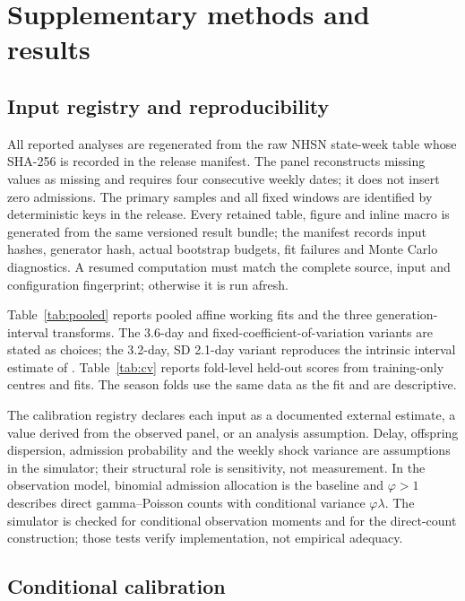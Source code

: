 \section{Supplementary methods and results}
\label{app:supplement}

\subsection{Input registry and reproducibility}
\label{app:inputs}

All reported analyses are regenerated from the raw NHSN state-week table whose SHA-256 is recorded in the release manifest. The panel reconstructs missing values as missing and requires four consecutive weekly dates; it does not insert zero admissions. The primary samples and all fixed windows are identified by deterministic keys in the release. Every retained table, figure and inline macro is generated from the same versioned result bundle; the manifest records input hashes, generator hash, actual bootstrap budgets, fit failures and Monte Carlo diagnostics. A resumed computation must match the complete source, input and configuration fingerprint; otherwise it is run afresh.

Table~\ref{tab:pooled} reports pooled affine working fits and the three generation-interval transforms. The 3.6-day and fixed-coefficient-of-variation variants are stated as choices; the 3.2-day, SD 2.1-day variant reproduces the intrinsic interval estimate of \citet{chan2025estimating}. Table~\ref{tab:cv} reports fold-level held-out scores from training-only centres and fits. The season folds use the same data as the fit and are descriptive.

The calibration registry declares each input as a documented external estimate, a value derived from the observed panel, or an analysis assumption. Delay, offspring dispersion, admission probability and the weekly shock variance are assumptions in the simulator; their structural role is sensitivity, not measurement. In the observation model, binomial admission allocation is the baseline and $\varphi>1$ describes direct gamma--Poisson counts with conditional variance $\varphi\lambda$. The simulator is checked for conditional observation moments and for the direct-count construction; those tests verify implementation, not empirical adequacy.

\subsection{Conditional calibration}
\label{app:calibration}

